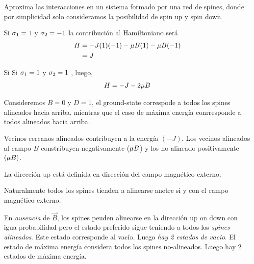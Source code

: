 Aproxima las interacciones en un sistema formado por una red de spines, donde por simplicidad solo consideramos la posibilidad de spin up y spin down.

\begin{ej}
	Si $\sigma_1=1$ y $\sigma_2=-1$ la contribución al Hamiltoniano será
	\begin{align}
  H&=-J(1)(-1)-\mu B(1)-\mu B(-1)\\
  &=J
\end{align}
\end{ej}

\begin{ej}
	Si Si $\sigma_1=1$ y $\sigma_2=1$ ,
	luego,
	\begin{equation}
  H=-J-2\mu B
\end{equation}
\end{ej}

Consideremos $B=0$ y $D=1$, el ground-state correspode a todos los spines alineados hacia arriba, mientras que el caso de máxima energía conrresponde a todos alineados hacia arriba.

Vecinos cercanos alineados contribuyen a la energía $(-J)$. Los vecinos alineados al campo $B$ constribuyen negativamente ($\mu B$) y los no alineado positivamente $(\mu B)$.

La dirección up está definida en dirección del campo magnético externo.

Naturalmente todos los spines tienden a alinearse anetre si y con el campo magnético externo.

En \textit{ausencia} de $\vec{B}$, los spines peuden alinearse en la dirección up on down con igua probabilidad pero el estado preferido sigue teniendo a todos los \textit{spines alineados}. Este estado corresponde al vacío. Luego \textit{hay 2 estados de vacío}. El estado de máxima energía considera todos los spines no-alineados. Luego hay 2 estados de máxima energía.


































